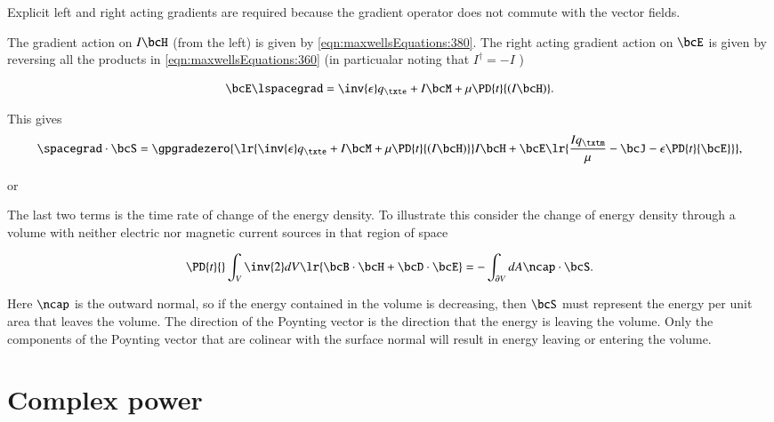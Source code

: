 Explicit left and right acting gradients are required because the gradient operator does not commute with the vector fields.

The gradient action on \( I \bcH \) (from the left) is given by
\cref{eqn:maxwellsEquations:380}.  The right acting gradient action on \( \bcE \) is given by reversing all the products in
\cref{eqn:maxwellsEquations:360} (in particualar noting that \( I^\dagger = -I \) )

\begin{dmath}\label{eqn:maxwellsEquations:660}
\bcE \lspacegrad = \inv{\epsilon} q_\txte + I \bcM + \mu \PD{t}{(I\bcH)}.
\end{dmath}

This gives
\begin{dmath}\label{eqn:maxwellsEquations:680}
\spacegrad \cdot \bcS
=
\gpgradezero
{
\lr{ \inv{\epsilon} q_\txte + I \bcM + \mu \PD{t}{(I\bcH)} } I \bcH
+
\bcE
\lr
{
\frac{I q_\txtm}{\mu} - \bcJ - \epsilon \PD{t}{\bcE}
}
}
,
\end{dmath}

or

The last two terms is the time rate of change of the energy density.  To illustrate this consider the change of energy density through a volume with neither electric nor magnetic current sources in that region of space

\begin{dmath}\label{eqn:maxwellsEquations:740}
\PD{t}{} \int_V
\inv{2} dV \lr{
\bcB \cdot \bcH
+ \bcD \cdot \bcE
}
=
-\int_{\partial V} dA \ncap \cdot \bcS.
\end{dmath}

Here \( \ncap \) is the outward normal, so if the energy contained in the volume is decreasing, then \( \bcS \) must represent the energy per unit area that leaves the volume.  The direction of the Poynting vector is the direction that the energy is leaving the volume.  Only the components of the Poynting vector that are colinear with the surface normal will result in energy leaving or entering the volume.

\section{Complex power}

